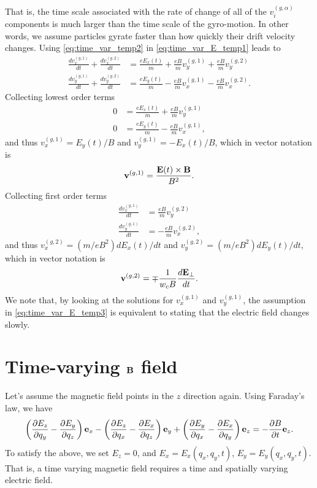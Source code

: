 \documentclass[a4paper,11pt]{report}
\begin{document}
That is, the time scale associated with the rate of change of all of the $v^{(g,\alpha)}_i$ components is much larger than the time scale of the gyro-motion. In other words, we assume particles gyrate faster than how quickly their drift velocity changes. Using \cref{eq:time_var_temp2} in \cref{eq:time_var_E_temp1} leads to
\begin{align}
    \frac{dv_x^{(g,1)}}{dt} + \frac{dv_x^{(g,2)}}{dt} &= \frac{e E_x(t)}{m} + \frac{eB}{m} v_y^{(g,1)} + \frac{eB}{m} v_y^{(g,2)} \nonumber \\
    \frac{dv_y^{(g,1)}}{dt} + \frac{dv_y^{(g,2)}}{dt} &= \frac{e E_y(t)}{m} - \frac{eB}{m} v_x^{(g,1)} - \frac{eB}{m} v_x^{(g,2)}.
\end{align}
Collecting lowest order terms
\begin{align}
    0 &= \frac{eE_x(t)}{m} + \frac{eB}{m} v_y^{(g,1)}  \nonumber \\
    0 &= \frac{eE_y(t)}{m} - \frac{eB}{m} v_x^{(g,1)} ,
\end{align}
and thus $v^{(g,1)}_x = E_y(t) / B$ and $v^{(g,1)}_y = -E_x(t) / B$, which in vector notation is
\begin{equation}
    \mathbf{v}^{(g,1)} = \frac{\mathbf{E}(t) \times \mathbf{B}}{B^2}.
\end{equation}
Collecting first order terms 
\begin{align}
    \frac{dv_x^{(g,1)}}{dt} &= \frac{eB}{m} v_y^{(g,2)} \nonumber \\
    \frac{dv_y^{(g,1)}}{dt} &= -\frac{eB}{m} v_x^{(g,2)},
\end{align}
and thus $v_x^{(g,2)} = (m/eB^2)dE_x(t)/dt$ and $v_y^{(g,2)} = (m/eB^2) dE_y(t)/dt$, which in vector notation is
\begin{equation}
    \label{eq:particle_polarization_drift}
    \mathbf{v}^{(g,2)} = \mp \frac{1}{w_c B}\frac{d\mathbf{E}_\perp}{dt}.
\end{equation}
We note that, by looking at the solutions for $v_x^{(g,1)}$ and $v_y^{(g,1)}$, the assumption in \cref{eq:time_var_E_temp3} is equivalent to stating that the electric field changes slowly. 

\section{Time-varying $\mathbf{B}$ field}
Let's assume the magnetic field points in the $z$ direction again. Using Faraday's law, we have
\begin{equation}
    \left(\frac{\partial E_z}{\partial q_y} - \frac{\partial E_y}{\partial q_z} \right) \mathbf{e}_x - \left(\frac{\partial E_z}{\partial q_x} - \frac{\partial E_x}{\partial q_z} \right) \mathbf{e}_y + \left(\frac{\partial E_y}{\partial q_x} - \frac{\partial E_x}{\partial q_y} \right) \mathbf{e}_z = -\frac{\partial B}{\partial t} \mathbf{e}_z.
\end{equation}
To satisfy the above, we set $E_z = 0$, and $E_x = E_x(q_x,q_y,t)$, $E_y = E_y(q_x,q_y,t)$. That is, a time varying magnetic field requires a time and spatially varying electric field. 
\end{document}
